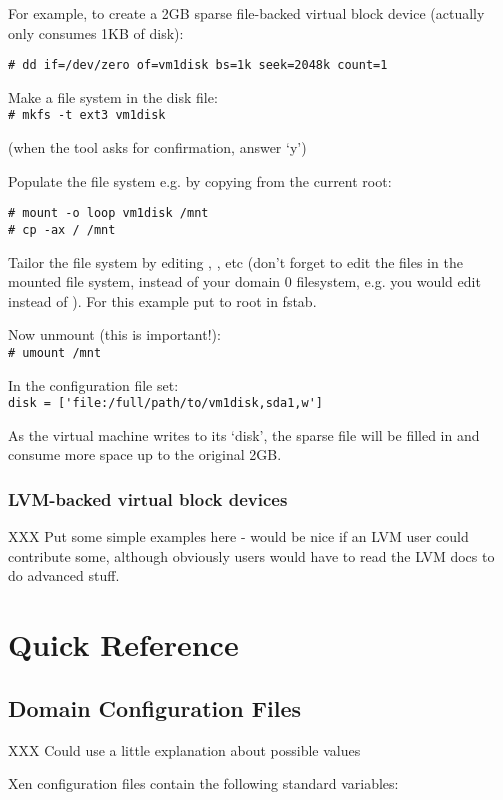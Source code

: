 \documentclass[11pt,twoside,final,openright]{xenstyle}
\begin{document}
For example, to create a 2GB sparse file-backed virtual block device
(actually only consumes 1KB of disk):

\verb_# dd if=/dev/zero of=vm1disk bs=1k seek=2048k count=1_

Make a file system in the disk file: \\
\verb_# mkfs -t ext3 vm1disk_

(when the tool asks for confirmation, answer `y')

Populate the file system e.g. by copying from the current root:
\begin{verbatim}
# mount -o loop vm1disk /mnt
# cp -ax / /mnt
\end{verbatim}
Tailor the file system by editing ,
, etc (don't forget to edit the files in the
mounted file system, instead of your domain 0 filesystem, e.g. you
would edit  instead of  ).  For
this example put  to root in fstab.

Now unmount (this is important!):\\
\verb_# umount /mnt_

In the configuration file set:\\
\verb_disk = ['file:/full/path/to/vm1disk,sda1,w']_

As the virtual machine writes to its `disk', the sparse file will be
filled in and consume more space up to the original 2GB.

\section{LVM-backed virtual block devices}

XXX Put some simple examples here - would be nice if an LVM user could
contribute some, although obviously users would have to read the LVM
docs to do advanced stuff.

\part{Quick Reference}

\chapter{Domain Configuration Files}
\label{cha:config}

XXX Could use a little explanation about possible values

Xen configuration files contain the following standard variables:
\end{document}

